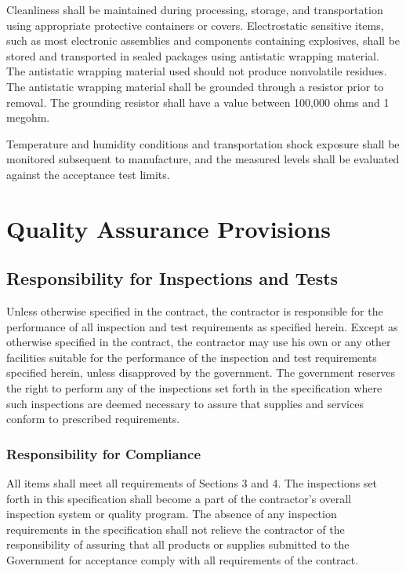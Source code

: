 \documentclass[12pt]{article}
\begin{document}
Cleanliness shall be maintained during processing, storage, and transportation using appropriate protective containers or
covers. 
Electrostatic sensitive items, such as most electronic assemblies and components containing explosives, shall be stored
and transported in sealed packages using antistatic wrapping material. 
The antistatic wrapping material used should not produce nonvolatile residues. 
The antistatic wrapping material shall be grounded through a resistor prior to removal. 
The grounding resistor shall have a value between 100,000 ohms and 1 megohm.

Temperature and humidity conditions and transportation shock exposure shall be monitored subsequent to manufacture, and the measured levels shall be evaluated against the acceptance test limits.


\clearpage
\section{Quality Assurance Provisions} %
\subsection{Responsibility for Inspections and Tests} %
Unless otherwise specified in the contract, the contractor is responsible for the performance of all inspection and test requirements as specified herein. 
Except as otherwise specified in the contract, the contractor may use his own or any other facilities suitable for the performance of the inspection and test requirements specified herein, unless disapproved by the government. 
The government reserves the right to perform any of the inspections set forth in the specification where such inspections are deemed necessary to assure that supplies and services conform to prescribed requirements.

\subsubsection{Responsibility for Compliance} %
All items shall meet all requirements of Sections 3 and 4.
The inspections set forth in this specification shall become a part of the contractor's overall inspection system or quality program. 
The absence of any inspection requirements in the specification shall not relieve the contractor of the responsibility of assuring that all products or supplies submitted to the Government for acceptance comply with all requirements of the contract.
\end{document}
